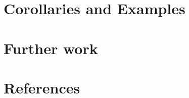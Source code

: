 \documentclass{elsarticle}
\theoremstyle{remark}
\begin{document}
\section{Corollaries and Examples}
\section{Further work}
\section*{References}


\end{document}
